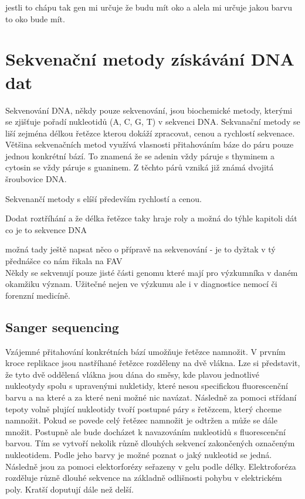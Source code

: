 \documentclass[czech,DP]{thesiskiv}
\begin{document}
jestli to chápu tak gen mi určuje že budu mít oko a alela mi určuje jakou barvu to oko bude mít.


\chapter{Sekvenační metody získávání DNA dat}
Sekvenování DNA, někdy pouze sekvenování, jsou biochemické metody, kterými se zjišťuje pořadí nukleotidů (A, C, G, T) v sekvenci DNA. Sekvanační metody se liší zejména délkou řetězce kterou dokáží zpracovat, cenou a rychlostí sekvenace. Většina sekvenačních metod využívá vlasnosti přitahováním báze do páru pouze jednou konkrétní bází. To znamená že se adenin vždy páruje s thyminem a cytosin se vždy páruje s guaninem. Z těchto párů vzniká již známá dvojitá šroubovice DNA. \cite{sekvenovani_ziva}

Sekvenančí metody s elíší především rychlostí a cenou.

Dodat roztříhání a že délka řetězce taky hraje roly
a možná do týhle kapitoli dát co je to sekvence DNA

možná tady ještě napsat něco o přípravě na sekvenování - je to dyžtak v tý přednášce co nám řikala na FAV
\\

Někdy se sekvenují pouze jisté části genomu které mají pro výzkumníka v daném okamžiku význam.
Užitečné nejen ve výzkumu ale i v diagnostice nemocí či forenzní medicíně.
\\
\section{Sanger sequencing}
Vzájemné přitahování konkrétních bází umožňuje řetězce namnožit. V prvním kroce replikace jsou nastříhané řetězce rozděleny na dvě vlákna. Lze si představit, že tyto dvě oddělená vlákna jsou dána do směsy, kde plavou jednotlivé nukleotydy spolu s upravenými nukletidy, které nesou specifickou fluorescenční barvu a na které a za které neni možné nic navázat. Následně za pomoci střídaní tepoty volně plující nukleotidy tvoří postupné páry s řetězcem, který chceme namnožit. Pokud se povede celý řetězec namnožit je odtržen a může se dále množit. Postupně ale bude docházet k navazováním nukleotidů s fluorescenční barvou. Tím se vytvoří nekolik různě dlouhých sekvencí zakončených označeným nukleotidem. Podle jeho barvy je možné poznat o jaký nukleotid se jedná. Následně jsou za pomoci elektorforézy seřazeny v gelu podle délky. Elektroforéza rozděluje různě dlouhé sekvence na základně odlišnosti pohybu v elektrickém poly. Kratší doputují dále než delší.     
\end{document}
